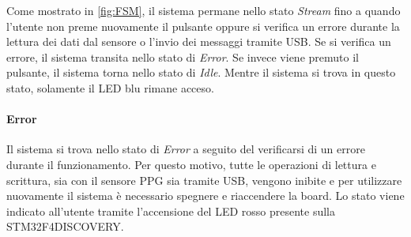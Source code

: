 Come mostrato in \Fig\ref{fig:FSM}, il sistema permane nello stato \textit{Stream} fino a quando l'utente non preme nuovamente il pulsante oppure si verifica un errore durante la lettura dei dati dal sensore o l'invio dei messaggi tramite USB. Se si verifica un errore, il sistema transita nello stato di \textit{Error}. Se invece viene premuto il pulsante, il sistema torna nello stato di \textit{Idle}. Mentre il sistema si trova in questo stato, solamente il LED blu rimane acceso.

\paragraph{Error} Il sistema si trova nello stato di \textit{Error} a seguito del verificarsi di un errore durante il funzionamento. Per questo motivo, tutte le operazioni di lettura e scrittura, sia con il sensore PPG sia tramite USB, vengono inibite e per utilizzare nuovamente il sistema è necessario spegnere e riaccendere la board. Lo stato viene indicato all'utente tramite l'accensione del LED rosso presente sulla STM32F4DISCOVERY. 

\clearpage